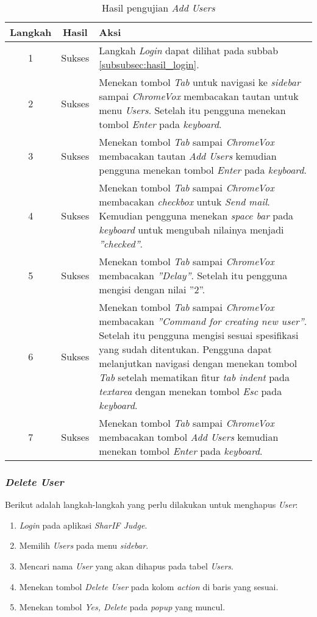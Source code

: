 \begin{table}[H]
	\centering
	\caption{Hasil pengujian \textit{Add Users}}
	\label{tab:hasil_add_users}
	\begin{tabular}{|c|c|p{12cm}|}
		\toprule
		Langkah & Hasil & Aksi\\
		\midrule
		1 & Sukses & Langkah \textit{Login} dapat dilihat pada subbab \ref{subsubsec:hasil_login}.\\
		2 & Sukses & Menekan tombol \textit{Tab} untuk navigasi ke \textit{sidebar} sampai \textit{ChromeVox} membacakan tautan untuk menu \textit{Users}. Setelah itu pengguna menekan tombol \textit{Enter} pada \textit{keyboard}.\\
		3 & Sukses & Menekan tombol \textit{Tab} sampai \textit{ChromeVox} membacakan tautan \textit{Add Users} kemudian pengguna menekan tombol \textit{Enter} pada \textit{keyboard}.\\
		4 & Sukses & Menekan tombol \textit{Tab} sampai \textit{ChromeVox} membacakan \textit{checkbox} untuk \textit{Send mail}. Kemudian pengguna menekan \textit{space bar} pada \textit{keyboard} untuk mengubah nilainya menjadi \textit{''checked''}.\\
		5 & Sukses & Menekan tombol \textit{Tab} sampai \textit{ChromeVox} membacakan \textit{''Delay''}. Setelah itu pengguna mengisi dengan nilai ''2''.\\
		6 & Sukses & Menekan tombol \textit{Tab} sampai \textit{ChromeVox} membacakan \textit{''Command for creating new user''}. Setelah itu pengguna mengisi sesuai spesifikasi yang sudah ditentukan. Pengguna dapat melanjutkan navigasi dengan menekan tombol \textit{Tab} setelah mematikan fitur \textit{tab indent} pada \textit{textarea} dengan menekan tombol \textit{Esc} pada \textit{keyboard}.\\
		7 & Sukses & Menekan tombol \textit{Tab} sampai \textit{ChromeVox} membacakan tombol \textit{Add Users} kemudian menekan tombol \textit{Enter} pada \textit{keyboard}.\\
		\bottomrule
	\end{tabular}
\end{table}

\subsubsection{\textit{Delete User}}
\label{subsubsec:skenario_delete_user}
Berikut adalah langkah-langkah yang perlu dilakukan untuk menghapus \textit{User}:

\begin{enumerate}
	\item \textit{Login} pada aplikasi \textit{SharIF Judge}.
	\item Memilih \textit{Users} pada menu \textit{sidebar}.
	\item Mencari nama \textit{User} yang akan dihapus pada tabel \textit{Users}.
	\item Menekan tombol \textit{Delete User} pada kolom \textit{action} di baris yang sesuai.
	\item Menekan tombol \textit{Yes, Delete} pada \textit{popup} yang muncul.
\end{enumerate}

